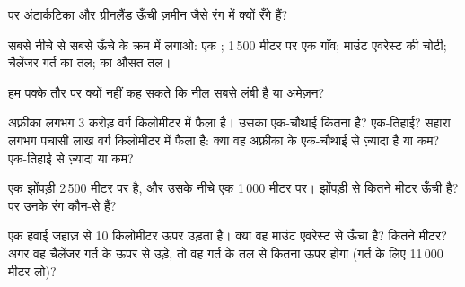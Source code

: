 \begin{exercise}[$\star$]\label{exo:g4:world-physical-map:6}
 पर अंटार्कटिका और ग्रीनलैंड ऊँची ज़मीन जैसे रंग में क्यों
रँगे हैं?
\end{exercise}

\begin{exercise}[$\star\star$]\label{exo:g4:world-physical-map:7}
सबसे नीचे से सबसे ऊँचे के क्रम में लगाओ: एक  ; 1\,500 मीटर पर एक
गाँव; माउंट एवरेस्ट की चोटी; चैलेंजर गर्त का तल;  का औसत
तल।
\end{exercise}

\begin{exercise}[$\star\star$]\label{exo:g4:world-physical-map:8}
हम पक्के तौर पर क्यों नहीं कह सकते कि नील सबसे लंबी  है या अमेज़न?
\end{exercise}

\begin{exercise}[$\star\star$]\label{exo:g4:world-physical-map:9}
अफ़्रीका लगभग 3 करोड़ वर्ग किलोमीटर में फैला है। उसका एक-चौथाई कितना है?
एक-तिहाई? सहारा लगभग पचासी लाख वर्ग किलोमीटर में फैला है: क्या वह अफ़्रीका के
एक-चौथाई से ज़्यादा है या कम? एक-तिहाई से ज़्यादा या कम?
\end{exercise}

\begin{exercise}[$\star\star$]\label{exo:g4:world-physical-map:10}
एक  झोंपड़ी 2\,500 मीटर पर है, और उसके नीचे एक  1\,000 मीटर पर। झोंपड़ी
 से कितने मीटर ऊँची है?  पर उनके रंग कौन-से हैं?
\end{exercise}

\begin{exercise}[$\star\star\star$]\label{exo:g4:world-physical-map:11}
एक हवाई जहाज़  से 10 किलोमीटर ऊपर उड़ता है। क्या वह माउंट एवरेस्ट से
ऊँचा है? कितने मीटर? अगर वह चैलेंजर गर्त के ऊपर से उड़े, तो वह गर्त के तल से
कितना ऊपर होगा (गर्त के लिए 11\,000 मीटर लो)?
\end{exercise}
